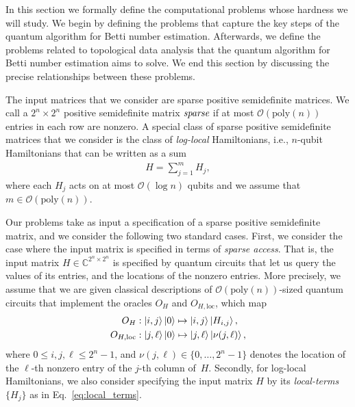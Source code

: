 \documentclass[a4paper, onecolumn, accepted=2022-08-28]{quantumarticle}
\newcommand{\bigO}[1]{\mathcal{O}\left( #1 \right)}
\begin{document}
In this section we formally define the computational problems whose hardness we will study.
We begin by defining the problems that capture the key steps of the quantum algorithm for Betti number estimation.
Afterwards, we define the problems related to topological data analysis that the quantum algorithm for Betti number estimation aims to solve.
We end this section by discussing the precise relationships between these problems.

The input matrices that we consider are sparse positive semidefinite matrices.
We call a $2^n \times 2^n$ positive semidefinite matrix $\emph{sparse}$ if at most $\bigO{\mathrm{poly}(n)}$ entries in each row are nonzero.
A special class of sparse positive semidefinite matrices that we consider is the class of \emph{log-local} Hamiltonians, i.e., $n$-qubit Hamiltonians that can be written as a sum
\begin{align}
  H = \sum_{j=1}^m H_j,
  \label{eq:local_terms}
\end{align}
where each $H_j$ acts on at most $\bigO{\log n}$ qubits and we assume that $m\in\bigO{\mathrm{poly}(n)}$.

Our problems take as input a specification of a sparse positive semidefinite matrix, and we consider the following two standard cases.
First, we consider the case where the input matrix is specified in terms of \emph{sparse access}.
That is, the input matrix $H \in \mathbb{C}^{2^n \times 2^n}$ is specified by quantum circuits that let us query the values of its entries, and the locations of the nonzero entries.
More precisely, we assume that we are given classical descriptions of $\bigO{\mathrm{poly}(n)}$-sized quantum circuits that implement the oracles $O_H$ and $O_{H, \mathrm{loc}}$, which map
\begin{align*}
  O_H&: \ket{i, j}\ket{0} \mapsto \ket{i, j}\ket{H_{i,j}},\\
  O_{H, \mathrm{loc}}&: \ket{j, \ell}\ket{0} \mapsto \ket{j, \ell}\ket{\nu(j, \ell)},
\end{align*}
where $0 \leq i, j , \ell \leq 2^n - 1$, and $\nu(j, \ell) \in \{0, \dots, 2^n - 1\}$ denotes the location of the $\ell$-th nonzero entry of the $j$-th column of~$H$.
Secondly, for log-local Hamiltonians, we also consider specifying the input matrix $H$ by its \emph{local-terms} $\{H_j\}$ as in Eq.~\eqref{eq:local_terms}.
\end{document}
